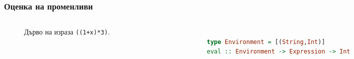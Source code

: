 \documentclass{beamer}
\begin{document}
\begin{frame}[fragile]
  \frametitle{Оценка на променливи}


\begin{columns}[t]
  \begin{column}{0.3\textwidth}

    \begin{figure}
      \centering
      \caption{Дърво на израза \texttt{((1+x)*3)}.}
      \label{fig:treeexpr}
      \end{figure}
      

  \end{column}
  \begin{column}{0.7\textwidth}

\begin{lstlisting}[basicstyle=\small,language=Haskell]

type Environment = [(String,Int)]
eval :: Environment -> Expression -> Int     

\end{lstlisting}

  \end{column}
\end{columns}

\end{frame}  


\end{document}
